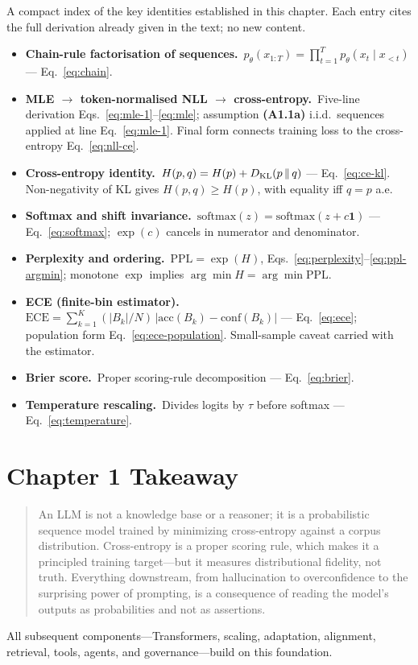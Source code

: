 \begin{derivledger}
A compact index of the key identities established in this chapter.
Each entry cites the full derivation already given in the text; no
new content.
\begin{itemize}
  \item \textbf{Chain-rule factorisation of sequences.}\
        $p_\theta(x_{1:T}) = \prod_{t=1}^{T} p_\theta(x_t \mid x_{<t})$
        --- Eq.~\eqref{eq:chain}.
  \item \textbf{MLE $\to$ token-normalised NLL $\to$ cross-entropy.}\
        Five-line derivation Eqs.~\eqref{eq:mle-1}--\eqref{eq:mle};
        assumption \textbf{(A1.1a)} i.i.d.\ sequences applied at line
        Eq.~\eqref{eq:mle-1}. Final form connects training loss to
        the cross-entropy Eq.~\eqref{eq:nll-ce}.
  \item \textbf{Cross-entropy identity.}\
        $H(p,q) = H(p) + D_{\mathrm{KL}}(p \,\|\, q)$
        --- Eq.~\eqref{eq:ce-kl}. Non-negativity of KL gives
        $H(p,q) \ge H(p)$, with equality iff $q = p$ a.e.
  \item \textbf{Softmax and shift invariance.}\
        $\mathrm{softmax}(z) = \mathrm{softmax}(z + c \mathbf{1})$
        --- Eq.~\eqref{eq:softmax}; $\exp(c)$ cancels in numerator
        and denominator.
  \item \textbf{Perplexity and ordering.}\
        $\mathrm{PPL} = \exp(H)$, Eqs.~\eqref{eq:perplexity}--\eqref{eq:ppl-argmin};
        monotone $\exp$ implies $\arg\min H = \arg\min \mathrm{PPL}$.
  \item \textbf{ECE (finite-bin estimator).}\
        $\mathrm{ECE} = \sum_{k=1}^{K} (|B_k|/N)\,|\mathrm{acc}(B_k) - \mathrm{conf}(B_k)|$
        --- Eq.~\eqref{eq:ece}; population form Eq.~\eqref{eq:ece-population}.
        Small-sample caveat carried with the estimator.
  \item \textbf{Brier score.}\
        Proper scoring-rule decomposition --- Eq.~\eqref{eq:brier}.
  \item \textbf{Temperature rescaling.}\
        Divides logits by $\tau$ before softmax --- Eq.~\eqref{eq:temperature}.
\end{itemize}
\end{derivledger}

\section{Chapter 1 Takeaway}

\begin{quote}
An LLM is not a knowledge base or a reasoner; it is a probabilistic sequence model trained by minimizing cross-entropy against a corpus distribution. Cross-entropy is a proper scoring rule, which makes it a principled training target---but it measures distributional fidelity, not truth. Everything downstream, from hallucination to overconfidence to the surprising power of prompting, is a consequence of reading the model's outputs as probabilities and not as assertions.
\end{quote}

All subsequent components---Transformers, scaling, adaptation, alignment, retrieval, tools, agents, and governance---build on this foundation.
